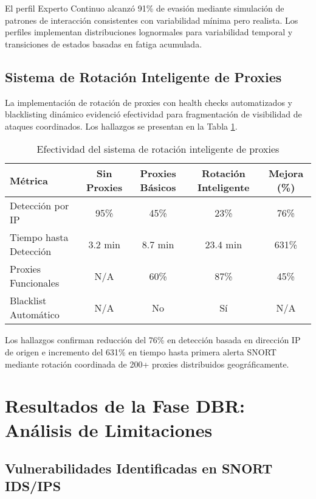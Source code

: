 El perfil Experto Continuo alcanzó 91\% de evasión mediante simulación de patrones de interacción consistentes con variabilidad mínima pero realista. Los perfiles implementan distribuciones lognormales para variabilidad temporal y transiciones de estados basadas en fatiga acumulada.

\subsection{Sistema de Rotación Inteligente de Proxies}

La implementación de rotación de proxies con health checks automatizados y blacklisting dinámico evidenció efectividad para fragmentación de visibilidad de ataques coordinados. Los hallazgos se presentan en la Tabla \ref{tab:proxy_rotation_results}.

\begin{table}[h]
\centering
\caption{Efectividad del sistema de rotación inteligente de proxies}
\label{tab:proxy_rotation_results}
\begin{tabular}{|l|c|c|c|c|}
\hline
\textbf{Métrica} & \textbf{Sin Proxies} & \textbf{Proxies Básicos} & \textbf{Rotación Inteligente} & \textbf{Mejora (\%)} \\
\hline
Detección por IP & 95\% & 45\% & 23\% & 76\% \\
\hline
Tiempo hasta Detección & 3.2 min & 8.7 min & 23.4 min & 631\% \\
\hline
Proxies Funcionales & N/A & 60\% & 87\% & 45\% \\
\hline
Blacklist Automático & N/A & No & Sí & N/A \\
\hline
\end{tabular}
\end{table}

Los hallazgos confirman reducción del 76\% en detección basada en dirección IP de origen e incremento del 631\% en tiempo hasta primera alerta SNORT mediante rotación coordinada de 200+ proxies distribuidos geográficamente.

\section{Resultados de la Fase DBR: Análisis de Limitaciones}

\subsection{Vulnerabilidades Identificadas en SNORT IDS/IPS}

